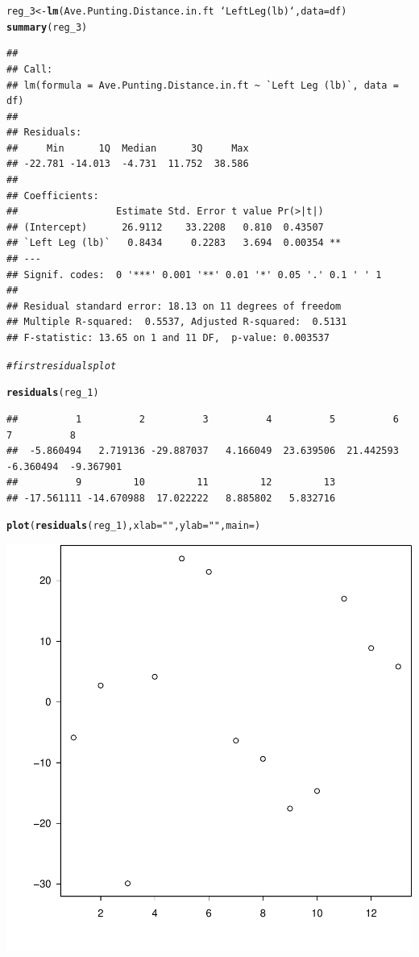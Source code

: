 \documentclass{article}\usepackage[]{graphicx}\usepackage[]{color}
\makeatletter
\newcommand{\hlstr}[1]{\textcolor[rgb]{0.192,0.494,0.8}{#1}}%
\newcommand{\hlcom}[1]{\textcolor[rgb]{0.678,0.584,0.686}{\textit{#1}}}%
\newcommand{\hlopt}[1]{\textcolor[rgb]{0,0,0}{#1}}%
\newcommand{\hlstd}[1]{\textcolor[rgb]{0.345,0.345,0.345}{#1}}%
\newcommand{\hlkwb}[1]{\textcolor[rgb]{0.69,0.353,0.396}{#1}}%
\newcommand{\hlkwc}[1]{\textcolor[rgb]{0.333,0.667,0.333}{#1}}%
\newcommand{\hlkwd}[1]{\textcolor[rgb]{0.737,0.353,0.396}{\textbf{#1}}}%
\newenvironment{kframe}{%
 \def\at@end@of@kframe{}%
 \ifinner\ifhmode%
  \def\at@end@of@kframe{\end{minipage}}%
  \begin{minipage}{\columnwidth}%
 \fi\fi%
 \def\FrameCommand##1{\hskip\@totalleftmargin \hskip-\fboxsep
 \colorbox{shadecolor}{##1}\hskip-\fboxsep
     \hskip-\linewidth \hskip-\@totalleftmargin \hskip\columnwidth}%
 \MakeFramed {\advance\hsize-\width
   \@totalleftmargin\z@ \linewidth\hsize
   \@setminipage}}%
 {\par\unskip\endMakeFramed%
 \at@end@of@kframe}
\newenvironment{knitrout}{}{} %
\makeatother
\begin{document}
\begin{knitrout}
\begin{kframe}
\begin{alltt}
\hlstd{reg_3}\hlkwb{<-}\hlkwd{lm}\hlstd{(Ave.Punting.Distance.in.ft}\hlopt{~}\hlstd{`Left Leg (lb)`,}\hlkwc{data}\hlstd{=df)}
\hlkwd{summary}\hlstd{(reg_3)}
\end{alltt}
\begin{verbatim}
## 
## Call:
## lm(formula = Ave.Punting.Distance.in.ft ~ `Left Leg (lb)`, data = df)
## 
## Residuals:
##     Min      1Q  Median      3Q     Max 
## -22.781 -14.013  -4.731  11.752  38.586 
## 
## Coefficients:
##                 Estimate Std. Error t value Pr(>|t|)   
## (Intercept)      26.9112    33.2208   0.810  0.43507   
## `Left Leg (lb)`   0.8434     0.2283   3.694  0.00354 **
## ---
## Signif. codes:  0 '***' 0.001 '**' 0.01 '*' 0.05 '.' 0.1 ' ' 1
## 
## Residual standard error: 18.13 on 11 degrees of freedom
## Multiple R-squared:  0.5537,	Adjusted R-squared:  0.5131 
## F-statistic: 13.65 on 1 and 11 DF,  p-value: 0.003537
\end{verbatim}
\begin{alltt}
\hlcom{# first residuals plot }

\hlkwd{residuals}\hlstd{(reg_1)}
\end{alltt}
\begin{verbatim}
##          1          2          3          4          5          6          7          8 
##  -5.860494   2.719136 -29.887037   4.166049  23.639506  21.442593  -6.360494  -9.367901 
##          9         10         11         12         13 
## -17.561111 -14.670988  17.022222   8.885802   5.832716
\end{verbatim}
\begin{alltt}
\hlkwd{plot}\hlstd{(}\hlkwd{residuals}\hlstd{(reg_1),}\hlkwc{xlab}\hlstd{=}\hlstr{" "}\hlstd{,}\hlkwc{ylab}\hlstd{=}\hlstr{" "}\hlstd{,}\hlkwc{main}\hlstd{=)}
\end{alltt}
\end{kframe}

{\centering \includegraphics[width=.6\linewidth]{figure/problem-3-mid-term-Rnwauto-report-1} 

}
\end{knitrout}
\end{document}
